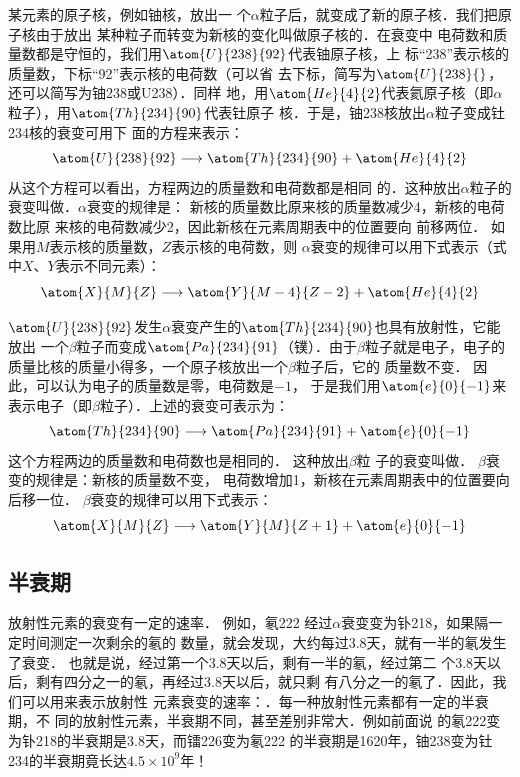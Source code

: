 某元素的原子核，例如铀核，放出一
个$\alpha$粒子后，就变成了新的原子核．我们把原子核由于放出
某种粒子而转变为新核的变化叫做原子核的．在衰变中
电荷数和质量数都是守恒的，我们用$\atom{U}{238}{92}$代表铀原子核，上
标“238”表示核的质量数，下标“92”表示核的电荷数（可以省
去下标，简写为$\atom{U}{238}{}$，还可以简写为铀238或U238）．同样
地，用$\atom{He}{4}{2}$代表氦原子核（即$\alpha$粒子），用$\atom{Th}{234}{90}$代表钍原子
核．于是，铀238核放出$\alpha$粒子变成钍234核的衰变可用下
面的方程来表示：
\[\atom{U}{238}{92}\longrightarrow \atom{Th}{234}{90}+\atom{He}{4}{2}\]
从这个方程可以看出，方程两边的质量数和电荷数都是相同
的．这种放出$\alpha$粒子的衰变叫做．$\alpha$衰变的规律是：
新核的质量数比原来核的质量数减少4，新核的电荷数比原
来核的电荷数减少2，因此新核在元素周期表中的位置要向
前移两位．
如果用$M$表示核的质量数，$Z$表示核的电荷数，则
$\alpha$衰变的规律可以用下式表示（式中$X$、$Y$表示不同元素）：
\[\atom{X}{M}{Z}\longrightarrow \atom{Y}{M-4}{Z-2}+\atom{He}{4}{2}   \]

$\atom{U}{238}{92}$发生$\alpha$衰变产生的$\atom{Th}{234}{90}$也具有放射性，它能放出
一个$\beta$粒子而变成$\atom{Pa}{234}{91}$（镤）．由于$\beta$粒子就是电子，电子的
质量比核的质量小得多，一个原子核放出一个$\beta$粒子后，它的
质量数不变．
因此，可以认为电子的质量数是零，电荷数是$-1$，
于是我们用$\atom{e}{0}{-1}$来表示电子（即$\beta$粒子）．上述的衰变可表示为：
\[\atom{Th}{234}{90}\longrightarrow \atom{Pa}{234}{91}+ \atom{e}{0}{-1}\]
这个方程两边的质量数和电荷数也是相同的．
这种放出$\beta$粒
子的衰变叫做．
$\beta$衰变的规律是：新核的质量数不变，
电荷数增加1，新核在元素周期表中的位置要向后移一位．
$\beta$衰变的规律可以用下式表示：
\[\atom{X}{M}{Z}\longrightarrow \atom{Y}{M}{Z+1}+ \atom{e}{0}{-1}\]



\subsection{半衰期}
放射性元素的衰变有一定的速率．
例如，氡222
经过$\alpha$衰变变为钋218，如果隔一定时间测定一次剩余的氡的
数量，就会发现，大约每过3.8天，就有一半的氡发生了衰变．
也就是说，经过第一个3.8天以后，剩有一半的氡，经过第二
个3.8天以后，剩有四分之一的氡，再经过3.8天以后，就只剩
有八分之一的氡了．因此，我们可以用来表示放射性
元素衰变的速率：．每一种放射性元素都有一定的半衰期，不
同的放射性元素，半衰期不同，甚至差别非常大．例如前面说
的氡222变为钋218的半衰期是3.8天，而镭226变为氡222
的半衰期是1620年，铀238变为钍234的半衰期竟长达$4.5
\times10^9$年！

